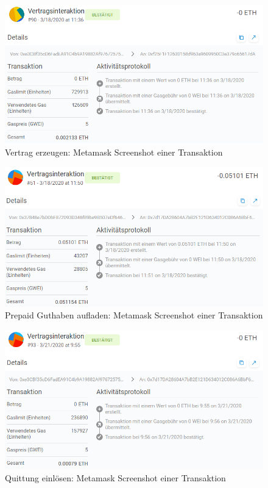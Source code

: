 \begin{figure}[h]
 \centering
 \includegraphics[width=1.0\textwidth]{gfx/screenshots/create_contract.PNG}
 \caption{Vertrag erzeugen: Metamask Screenshot einer Transaktion}
 \label{fig:appendix:costs:create}
\end{figure}

\begin{figure}[h]
 \centering
 \includegraphics[width=1.0\textwidth]{gfx/screenshots/charge_contract.PNG}
 \caption{Prepaid Guthaben aufladen: Metamask Screenshot einer Transaktion}
 \label{fig:appendix:costs:charge}
\end{figure}

\begin{figure}[h]
 \centering
 \includegraphics[width=1.0\textwidth]{gfx/screenshots/redeem.PNG}
 \caption{Quittung einlösen: Metamask Screenshot einer Transaktion}
 \label{fig:appendix:costs:reddeem}
\end{figure}

